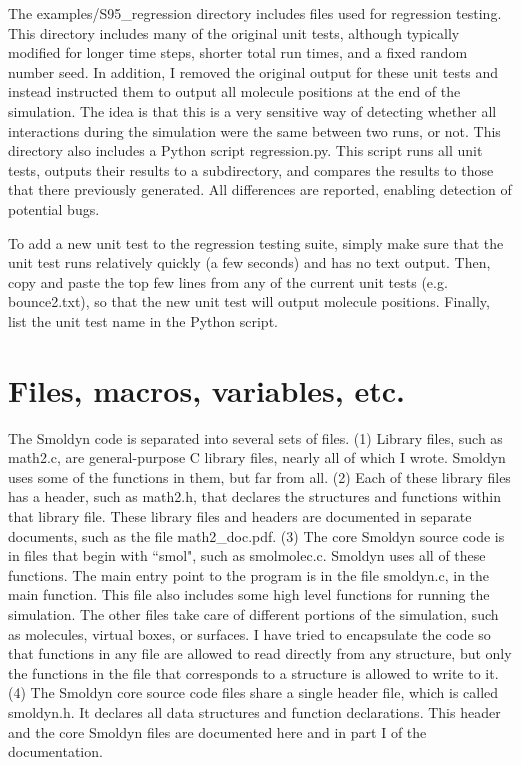 \documentclass {book}
\begin{document}
The examples/S95\_regression directory includes files used for regression testing.  This directory includes many of the original unit tests, although typically modified for longer time steps, shorter total run times, and a fixed random number seed.  In addition, I removed the original output for these unit tests and instead instructed them to output all molecule positions at the end of the simulation.  The idea is that this is a very sensitive way of detecting whether all interactions during the simulation were the same between two runs, or not.  This directory also includes a Python script regression.py.  This script runs all unit tests, outputs their results to a subdirectory, and compares the results to those that there previously generated.  All differences are reported, enabling detection of potential bugs.

To add a new unit test to the regression testing suite, simply make sure that the unit test runs relatively quickly (a few seconds) and has no text output.  Then, copy and paste the top few lines from any of the current unit tests (e.g. bounce2.txt), so that the new unit test will output molecule positions.  Finally, list the unit test name in the Python script.


\chapter{Files, macros, variables, etc.}

The Smoldyn code is separated into several sets of files.  (1) Library files, such as math2.c, are general-purpose C library files, nearly all of which I wrote.  Smoldyn uses some of the functions in them, but far from all.  (2) Each of these library files has a header, such as math2.h, that declares the structures and functions within that library file.  These library files and headers are documented in separate documents, such as the file math2\_doc.pdf.  (3) The core Smoldyn source code is in files that begin with ``smol", such as smolmolec.c.  Smoldyn uses all of these functions.  The main entry point to the program is in the file smoldyn.c, in the main function.  This file also includes some high level functions for running the simulation.  The other files take care of different portions of the simulation, such as molecules, virtual boxes, or surfaces.  I have tried to encapsulate the code so that functions in any file are allowed to read directly from any structure, but only the functions in the file that corresponds to a structure is allowed to write to it.  (4) The Smoldyn core source code files share a single header file, which is called smoldyn.h.  It declares all data structures and function declarations.  This header and the core Smoldyn files are documented here and in part I of the documentation.
\end{document}
